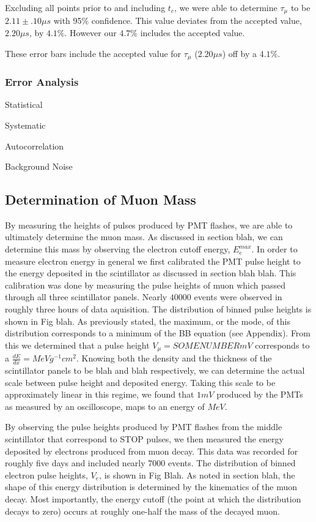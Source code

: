 Excluding all points prior to and including $t_{c}$, we were able to determine $\tau_{\mu}$ to be $2.11 \pm .10 \mu s$ with 95\% confidence.  This value deviates from the accepted value, $2.20\mu s$, by $4.1\%$.  However our $4.7\%$ includes the accepted value.

These error bars include the accepted value for $\tau_{\mu}$ ($2.20\mu s$) off by a $4.1\%$.

\subsubsection{Error Analysis}

Statistical

Systematic

Autocorrelation

Background Noise

\subsection{Determination of Muon Mass}

By measuring the heights of pulses produced by PMT flashes, we are able to ultimately determine the muon mass.  As discussed in section blah, we can determine this mass by observing the electron cutoff energy, $E_{e}^{max}$. In order to measure electron energy in general we first calibrated the PMT pulse height to the energy deposited in the scintillator as discussed in section blah blah. This calibration was done by measuring the pulse heights of muon which passed through all three scintillator panels.  Nearly $40000$ events were observed in roughly three hours of data aquisition.  The distribution of binned pulse heights is shown in Fig blah.  As previously stated, the maximum, or the mode, of this distribution corresponds to a minimum of the BB equation (see Appendix).  From this we determined that a pulse height $V_{\mu} = SOME NUMBER mV$ corresponds to a $\frac{dE}{dx}= MeV g^{-1} cm^{2}$.  Knowing both the density and the thickness of the scintillator panels to be blah and blah respectively, we can determine the actual scale between pulse height and deposited energy.  Taking this scale to be approximately linear in this regime, we found that $1mV$ produced by the PMTs as measured by an oscilloscope, maps to an energy of $MeV$. 

By observing the pulse heights produced by PMT flashes from the middle scintillator that correspond to STOP pulses, we then measured the energy deposited by electrons produced from muon decay.  This data was recorded for roughly five days and included nearly $7000$ events.  The distribution of binned electron pulse heights, $V_{e}$, is shown in Fig Blah.  As noted in section blah, the shape of this energy distribution is determined by the kinematics of the muon decay.  Most importantly, the energy cutoff (the point at which the distribution decays to zero) occurs at roughly one-half the mass of the decayed muon.

